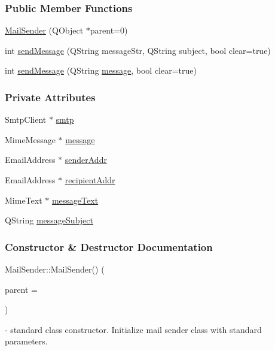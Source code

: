 \subsubsection*{Public Member Functions}
\begin{DoxyCompactItemize}
\item 
\mbox{\hyperlink{classMailSender_afad3d5334eb2ce670dd351d6e4578170}{Mail\+Sender}} (Q\+Object $\ast$parent=0)
\item 
int \mbox{\hyperlink{classMailSender_a57749e1c2f79dfe8d3c0dbb0e984f9b9}{send\+Message}} (Q\+String message\+Str, Q\+String subject, bool clear=true)
\item 
int \mbox{\hyperlink{classMailSender_afcfdcae3a5ffb196d8357866a9d19020}{send\+Message}} (Q\+String \mbox{\hyperlink{classMailSender_aacde6999850036655c9a4a5e99a4bead}{message}}, bool clear=true)
\end{DoxyCompactItemize}
\subsubsection*{Private Attributes}
\begin{DoxyCompactItemize}
\item 
Smtp\+Client $\ast$ \mbox{\hyperlink{classMailSender_af89aab8c2f9788360352e89e3434988d}{smtp}}
\item 
Mime\+Message $\ast$ \mbox{\hyperlink{classMailSender_aacde6999850036655c9a4a5e99a4bead}{message}}
\item 
Email\+Address $\ast$ \mbox{\hyperlink{classMailSender_a07af5d8ff3491cc11187f28bfbac85d8}{sender\+Addr}}
\item 
Email\+Address $\ast$ \mbox{\hyperlink{classMailSender_a9979dc95139744a95d5814b2ea03174e}{recipient\+Addr}}
\item 
Mime\+Text $\ast$ \mbox{\hyperlink{classMailSender_a39b44ca80550570dfc8ae847038f271c}{message\+Text}}
\item 
Q\+String \mbox{\hyperlink{classMailSender_ab289a6d7038218f62211335320971427}{message\+Subject}}
\end{DoxyCompactItemize}


\subsubsection{Constructor \& Destructor Documentation}
\mbox{\label{classMailSender_afad3d5334eb2ce670dd351d6e4578170}} 
{\footnotesize\ttfamily Mail\+Sender\+::\texorpdfstring{Mail\+Sender()}{MailSender} (\begin{DoxyParamCaption}\item[{Q\+Object $\ast$}]{parent = {} }\end{DoxyParamCaption})\hspace{0.3cm}{\ttfamily [explicit]}} - standard class constructor. Initialize mail sender class with standard parameters.



